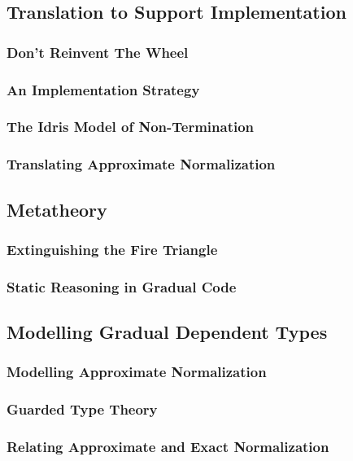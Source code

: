 \subsection{Translation to Support Implementation}

\subsubsection{Don't Reinvent The Wheel}

\subsubsection{An Implementation Strategy}

\subsubsection{The Idris Model of Non-Termination}

\subsubsection{Translating Approximate Normalization}


\subsection{Metatheory}

\subsubsection{Extinguishing the Fire Triangle}

\subsubsection{Static Reasoning in Gradual Code}

\subsection{Modelling Gradual Dependent Types}


\subsubsection{Modelling Approximate Normalization}

\subsubsection{Guarded Type Theory}

\subsubsection{Relating Approximate and Exact Normalization}
